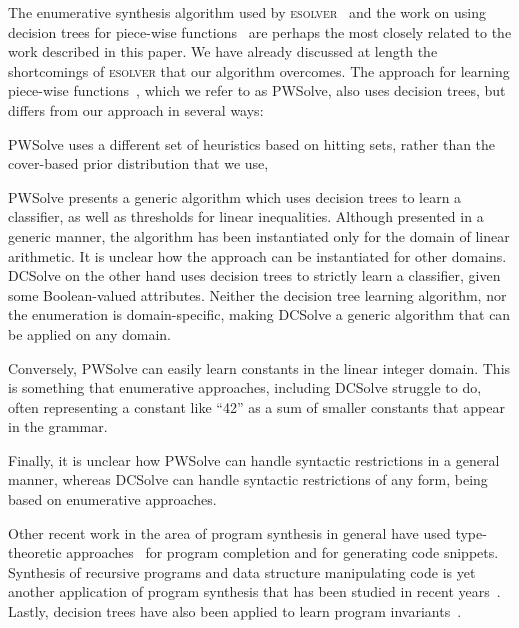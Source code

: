 \documentclass{llncs}
\newcommand{\dcsolve}{{\sffamily\fontsize{8.5}{10}\selectfont
    DCSolve}\xspace}
\newcommand{\esolver}{\textsc{esolver}\xspace}
\newcommand{\pwsolve}{{\sffamily\fontsize{8.5}{10}\selectfont
    PWSolve}\xspace}
\begin{document}
The enumerative synthesis algorithm used by
\esolver~\cite{udupa-transit, udupa-sygus} and the work on using decision
trees for piece-wise functions~\cite{madhusudan-16-pw} are perhaps the
most closely related to the work described in this paper. We have
already discussed at length the shortcomings of \esolver that our
algorithm overcomes. The approach for learning piece-wise
functions~\cite{madhusudan-16-pw}, which we refer to as \pwsolve, also
uses decision trees, but differs from our approach in several ways:
\begin{inparaenum}[(a)]
\item
\pwsolve uses a different set of heuristics based on hitting sets,
rather than the cover-based prior distribution that we use,
\item
\pwsolve presents a generic algorithm which uses decision trees to
learn a classifier, as well as thresholds for linear
inequalities. Although presented in a generic manner, the algorithm
has been instantiated only for the domain of linear arithmetic. It is
unclear how the approach can be instantiated for other
domains. \dcsolve on the other hand uses decision trees to strictly
learn a classifier, given some Boolean-valued attributes. Neither the
decision tree learning algorithm, nor the enumeration is
domain-specific, making \dcsolve a generic algorithm that can be
applied on any domain.
\item
Conversely, \pwsolve can easily learn constants in the linear
integer domain. This is something that enumerative approaches,
including \dcsolve struggle to do, often representing a constant like
``42'' as a sum of smaller constants that appear in the grammar.
\item
Finally, it is unclear how \pwsolve can handle syntactic restrictions
in a general manner, whereas \dcsolve can handle syntactic
restrictions of any form, being based on enumerative
approaches.
\end{inparaenum}

Other recent work in the area of program synthesis in general have
used type-theoretic approaches~\cite{gvero-13,osera-15,frankle-16} for
program completion and for generating code snippets. Synthesis of
recursive programs and data structure manipulating code is yet another
application of program synthesis that has been studied in recent
years~\cite{kuncak-10,kneuss-13,albarghouthi-13,feser-15}. Lastly,
decision trees have also been applied to learn program
invariants~\cite{garg-16}.
\end{document}
